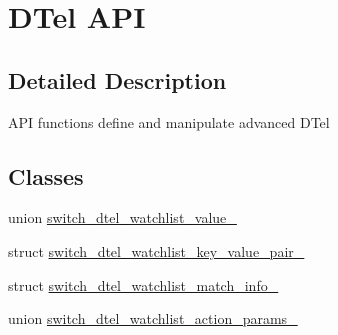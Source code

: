 \hypertarget{group__DTel}{\section{D\+Tel A\+P\+I}
\label{group__DTel}
}


\subsection{Detailed Description}
A\+P\+I functions define and manipulate advanced D\+Tel \subsection*{Classes}
\begin{DoxyCompactItemize}
\item 
union \hyperlink{unionswitch__dtel__watchlist__value__}{switch\+\_\+dtel\+\_\+watchlist\+\_\+value\+\_\+}
\item 
struct \hyperlink{structswitch__dtel__watchlist__key__value__pair__}{switch\+\_\+dtel\+\_\+watchlist\+\_\+key\+\_\+value\+\_\+pair\+\_\+}
\item 
struct \hyperlink{structswitch__dtel__watchlist__match__info__}{switch\+\_\+dtel\+\_\+watchlist\+\_\+match\+\_\+info\+\_\+}
\item 
union \hyperlink{unionswitch__dtel__watchlist__action__params__}{switch\+\_\+dtel\+\_\+watchlist\+\_\+action\+\_\+params\+\_\+}
\end{DoxyCompactItemize}
